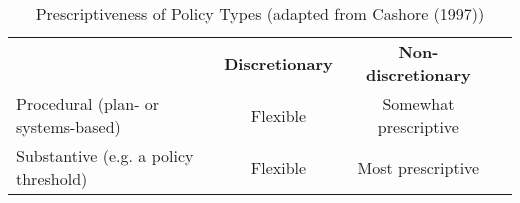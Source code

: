 \begin{table}
\caption{Prescriptiveness of Policy Types (adapted from Cashore (1997))}
\label{prescriptiveness}

\renewcommand{\arraystretch}{1.5} 
\centering

\begin{tabular}{lccc}
 & \textbf{Discretionary} & \textbf{Non-discretionary} \\
 \cline{2-3} 
Procedural (plan- or systems-based) & Flexible & Somewhat prescriptive \\
 \cline{2-3} 
Substantive (e.g. a policy threshold) & Flexible & Most prescriptive \\
 \cline{2-3} 
\end{tabular}

\end{table}